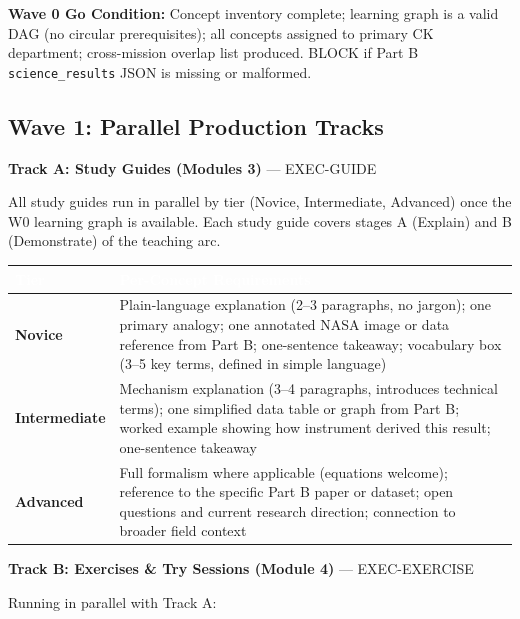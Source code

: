 \documentclass[11pt,letterpaper]{article}
\newcommand{\tableheader}[1]{\textbf{\sffamily\textcolor{white}{#1}}}
\begin{document}
\textbf{Wave 0 Go Condition:} Concept inventory complete; learning graph is a valid DAG (no circular prerequisites); all concepts assigned to primary CK department; cross-mission overlap list produced. BLOCK if Part B \texttt{science\_results} JSON is missing or malformed.

\subsection{Wave 1: Parallel Production Tracks}

\textbf{Track A: Study Guides (Modules 3)} --- EXEC-GUIDE

All study guides run in parallel by tier (Novice, Intermediate, Advanced) once the W0 learning graph is available. Each study guide covers stages A (Explain) and B (Demonstrate) of the teaching arc.

\begin{center}
\begin{tabularx}{\textwidth}{L{2.5cm}X}
\toprule
{}
\tableheader{Tier} & \tableheader{Per-Concept Requirements} \\
\midrule
\textcolor{novice}{\textbf{Novice}} & Plain-language explanation (2--3 paragraphs, no jargon); one primary analogy; one annotated NASA image or data reference from Part B; one-sentence takeaway; vocabulary box (3--5 key terms, defined in simple language) \\
\textcolor{intermediate}{\textbf{Intermediate}} & Mechanism explanation (3--4 paragraphs, introduces technical terms); one simplified data table or graph from Part B; worked example showing how instrument derived this result; one-sentence takeaway \\
\textcolor{advanced}{\textbf{Advanced}} & Full formalism where applicable (equations welcome); reference to the specific Part B paper or dataset; open questions and current research direction; connection to broader field context \\
\bottomrule
\end{tabularx}
\end{center}

\textbf{Track B: Exercises \& Try Sessions (Module 4)} --- EXEC-EXERCISE

Running in parallel with Track A:
\end{document}
